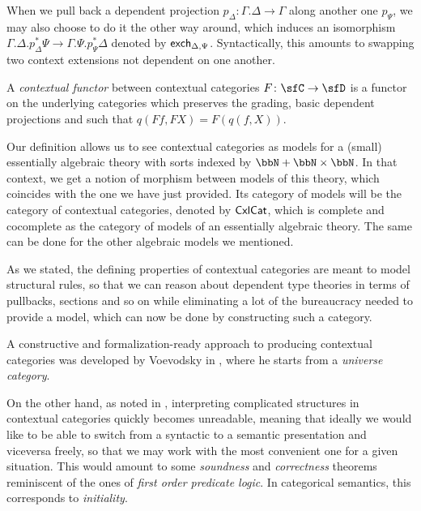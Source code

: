 \begin{rmk}
  When we pull back a dependent projection
  $p_\Delta\colon\Gamma.\Delta\rightarrow\Gamma$ along another one
  $p_\Psi$, we may also choose to do it the other way around, which induces an
  isomorphism
  $\Gamma.\Delta.p^*_\Delta\Psi\rightarrow\Gamma.\Psi.p^*_\Psi\Delta$
  denoted by $\operatorname{\mathsf{exch}}_{\Delta,\Psi}$. Syntactically, this amounts to swapping two
  context extensions not dependent on one another.
\end{rmk}

\begin{defn}
  A \emph{contextual functor} between contextual categories
  $F\colon\sfC\rightarrow\sfD$ is a functor on the underlying categories which
  preserves the grading, basic dependent projections and such that
  $q(Ff,FX)=F(q(f,X))$.
\end{defn}

\begin{rmk}
  Our definition allows us to see contextual categories as models for a (small)
  essentially algebraic theory \cite{AR94} with sorts
  indexed by $\bbN+\bbN\times\bbN$. In that context, we get a notion of
  morphism between models of this theory,
  which coincides with the one we have just provided. Its category of models
  will be the category of contextual categories, denoted by $\operatorname{\mathsf{CxlCat}}$,
  which is complete and cocomplete as the category of models of an
  essentially algebraic theory. The same can be done for the other algebraic
  models we mentioned.
\end{rmk}

As we stated, the defining properties of contextual
categories are meant to model structural rules, so that we can reason about
dependent type theories in terms of pullbacks, sections and so on while
eliminating a lot of the bureaucracy needed to provide a model, which can now be
done by constructing such a category.

\begin{exmp}
  A constructive and formalization-ready approach to producing contextual
categories was developed by Voevodsky in \cite{Voe14b,Voe14b,Voe15a,Voe15b},
  where he starts from a \emph{universe category}.
\end{exmp}

On the other hand, as noted in \cite[par.\ 1.2]{KL12}, interpreting complicated
structures in
contextual categories quickly becomes unreadable, meaning that ideally we would
like to be able to switch from a syntactic to a semantic presentation
and viceversa freely, so that we may work with the most
convenient one for a given situation. This would amount to some \emph{soundness}
and \emph{correctness} theorems reminiscent of the ones of \emph{first order
predicate logic}. In categorical semantics, this corresponds to
\emph{initiality}.

